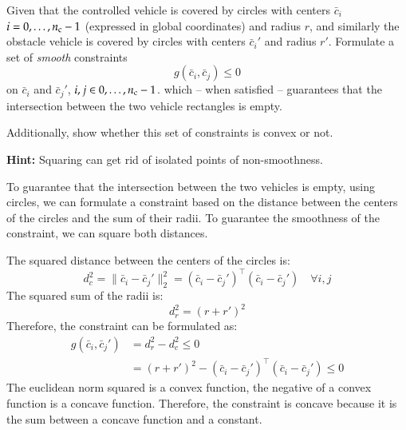 \documentclass[]{article}
\begin{document}
\begin{assignment}
	Given that the controlled vehicle is covered by circles with 
	centers $\bar{c}_i$ $i = 0, \dots, n_{\mathrm{c}}-1$ (expressed in global coordinates) and
	radius $r$, and similarly the obstacle vehicle is covered by circles 
	with centers $\bar{c}_i'$ and radius $r'$. 
	Formulate a set of \textit{smooth} constraints 
	\[ 
		g(\bar{c}_i, \bar{c}_j) \leq 0
	\]
	on $\bar{c}_i$ and $\bar{c}_j'$, $i,j \in 0, \dots, n_{\mathrm{c}}-1$.
	which -- when satisfied -- guarantees that the intersection between 
	the two vehicle rectangles is empty.

	Additionally, show whether this set of constraints is convex or not.

	\textbf{Hint:} Squaring can get rid of isolated points of non-smoothness.
\end{assignment}
\begin{flushleft}
	To guarantee that the intersection between the two vehicles is empty, using circles, we can formulate a constraint based on the distance between the centers of the circles and the sum of their radii. To guarantee the smoothness of the constraint, we can square both distances.
\end{flushleft}
The squared distance between the centers of the circles is:
\[
	d_{c}^2 = \|\bar{c}_i - \bar{c}_j'\|_2^2 = (\bar{c}_i - \bar{c}_j')^\top (\bar{c}_i - \bar{c}_j') \quad \forall i,j
\]
The squared sum of the radii is:
\[
	d_{r}^2 = (r + r')^2
\]
Therefore, the constraint can be formulated as:
\begin{equation}
	\begin{aligned}
		g(\bar{c}_i, \bar{c}_j') &= d_{r}^2 - d_{c}^2 \leq 0 \\
								 &= (r + r')^2 - (\bar{c}_i - \bar{c}_j')^\top (\bar{c}_i - \bar{c}_j') \leq 0
	\end{aligned}
\end{equation}
The euclidean norm squared is a convex function, the negative of a convex function is a concave function. Therefore, the constraint is concave because it is the sum between a concave function and a constant. 
\end{document}
